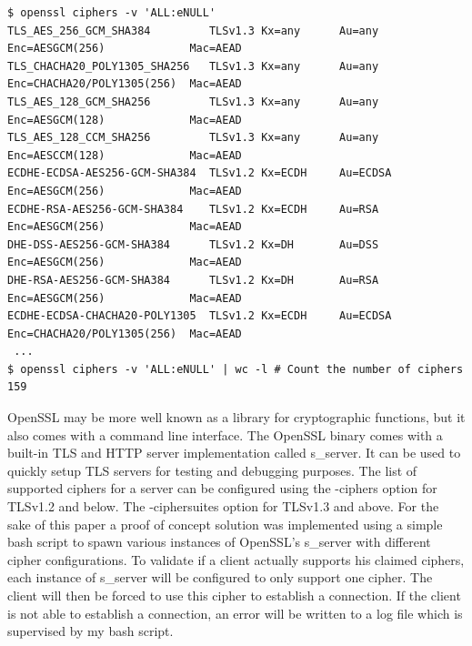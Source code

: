 \documentclass[12pt]{scrbook}
\begin{document}
\begin{lstlisting}[breaklines=true,basicstyle=\tiny,caption={Listing supported
            ciphers and counting them in a shell},captionpos=b]
$ openssl ciphers -v 'ALL:eNULL'
TLS_AES_256_GCM_SHA384         TLSv1.3 Kx=any      Au=any   Enc=AESGCM(256)             Mac=AEAD
TLS_CHACHA20_POLY1305_SHA256   TLSv1.3 Kx=any      Au=any   Enc=CHACHA20/POLY1305(256)  Mac=AEAD
TLS_AES_128_GCM_SHA256         TLSv1.3 Kx=any      Au=any   Enc=AESGCM(128)             Mac=AEAD
TLS_AES_128_CCM_SHA256         TLSv1.3 Kx=any      Au=any   Enc=AESCCM(128)             Mac=AEAD
ECDHE-ECDSA-AES256-GCM-SHA384  TLSv1.2 Kx=ECDH     Au=ECDSA Enc=AESGCM(256)             Mac=AEAD
ECDHE-RSA-AES256-GCM-SHA384    TLSv1.2 Kx=ECDH     Au=RSA   Enc=AESGCM(256)             Mac=AEAD
DHE-DSS-AES256-GCM-SHA384      TLSv1.2 Kx=DH       Au=DSS   Enc=AESGCM(256)             Mac=AEAD
DHE-RSA-AES256-GCM-SHA384      TLSv1.2 Kx=DH       Au=RSA   Enc=AESGCM(256)             Mac=AEAD
ECDHE-ECDSA-CHACHA20-POLY1305  TLSv1.2 Kx=ECDH     Au=ECDSA Enc=CHACHA20/POLY1305(256)  Mac=AEAD
 ...
$ openssl ciphers -v 'ALL:eNULL' | wc -l # Count the number of ciphers
159
    \end{lstlisting}

OpenSSL may be more well known as a library for cryptographic functions, but it
also comes with a command line interface. The OpenSSL binary comes with a
built-in TLS and HTTP server implementation called s\_server. It can be used to
quickly setup TLS servers for testing and debugging purposes. The list of
supported ciphers for a server can be configured using the -ciphers option for
TLSv1.2 and below. The -ciphersuites option for TLSv1.3 and above. For the
sake of this paper a proof of concept solution was implemented using a simple
bash script to spawn various instances of OpenSSL's s\_server with different
cipher configurations. To validate if a client actually supports his claimed
ciphers, each instance of s\_server will be configured to only support one
cipher. The client will then be forced to use this cipher to establish a
connection. If the client is not able to establish a connection, an error will be
written to a log file which is supervised by my bash script.
\end{document}
